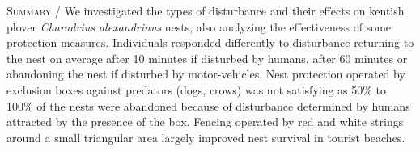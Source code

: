 {\small
\noindent \textsc{\color{MUSEBLUE} Summary} / We investigated the types of disturbance
and their effects on kentish plover \textit{Charadrius
alexandrinus} nests, also analyzing
the effectiveness of some protection measures. Individuals
responded differently to disturbance returning to the nest on average after 10 minutes if
disturbed by humans, after 60 minutes or abandoning the nest if
disturbed by motor-vehicles. Nest protection operated by exclusion
boxes against predators (dogs, crows) was not satisfying as 50\% to
100\% of the nests were abandoned because of disturbance determined by
humans attracted by the presence of the box. Fencing operated by red
and white strings around a small triangular area largely improved nest
survival in tourist beaches.\\
}
\vspace{1cm}




